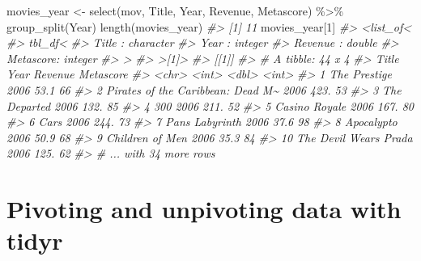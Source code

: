 \documentclass[
]{book}
\newenvironment{Shaded}{\begin{snugshade}}{\end{snugshade}}
\newcommand{\CommentTok}[1]{\textcolor[rgb]{0.56,0.35,0.01}{\textit{#1}}}
\newcommand{\DecValTok}[1]{\textcolor[rgb]{0.00,0.00,0.81}{#1}}
\newcommand{\FunctionTok}[1]{\textcolor[rgb]{0.00,0.00,0.00}{#1}}
\newcommand{\NormalTok}[1]{#1}
\newcommand{\OtherTok}[1]{\textcolor[rgb]{0.56,0.35,0.01}{#1}}
\newcommand{\SpecialCharTok}[1]{\textcolor[rgb]{0.00,0.00,0.00}{#1}}
\begin{document}
\begin{Shaded}
\begin{Highlighting}[]
\NormalTok{movies\_year }\OtherTok{\textless{}{-}} 
\FunctionTok{select}\NormalTok{(mov, Title, Year, Revenue, Metascore) }\SpecialCharTok{\%\textgreater{}\%}
  \FunctionTok{group\_split}\NormalTok{(Year)}
\FunctionTok{length}\NormalTok{(movies\_year)}
\CommentTok{\#\textgreater{} [1] 11}
\NormalTok{movies\_year[}\DecValTok{1}\NormalTok{]}
\CommentTok{\#\textgreater{} \textless{}list\_of\textless{}}
\CommentTok{\#\textgreater{}   tbl\_df\textless{}}
\CommentTok{\#\textgreater{}     Title    : character}
\CommentTok{\#\textgreater{}     Year     : integer}
\CommentTok{\#\textgreater{}     Revenue  : double}
\CommentTok{\#\textgreater{}     Metascore: integer}
\CommentTok{\#\textgreater{}   \textgreater{}}
\CommentTok{\#\textgreater{} \textgreater{}[1]\textgreater{}}
\CommentTok{\#\textgreater{} [[1]]}
\CommentTok{\#\textgreater{} \# A tibble: 44 x 4}
\CommentTok{\#\textgreater{}    Title                              Year Revenue Metascore}
\CommentTok{\#\textgreater{}    \textless{}chr\textgreater{}                             \textless{}int\textgreater{}   \textless{}dbl\textgreater{}     \textless{}int\textgreater{}}
\CommentTok{\#\textgreater{}  1 The Prestige                       2006    53.1        66}
\CommentTok{\#\textgreater{}  2 Pirates of the Caribbean: Dead M\textasciitilde{}  2006   423.         53}
\CommentTok{\#\textgreater{}  3 The Departed                       2006   132.         85}
\CommentTok{\#\textgreater{}  4 300                                2006   211.         52}
\CommentTok{\#\textgreater{}  5 Casino Royale                      2006   167.         80}
\CommentTok{\#\textgreater{}  6 Cars                               2006   244.         73}
\CommentTok{\#\textgreater{}  7 Pan\textquotesingle{}s Labyrinth                    2006    37.6        98}
\CommentTok{\#\textgreater{}  8 Apocalypto                         2006    50.9        68}
\CommentTok{\#\textgreater{}  9 Children of Men                    2006    35.3        84}
\CommentTok{\#\textgreater{} 10 The Devil Wears Prada              2006   125.         62}
\CommentTok{\#\textgreater{} \# ... with 34 more rows}
\end{Highlighting}
\end{Shaded}

\hypertarget{tr-reshape}{%
\section{Pivoting and unpivoting data with tidyr}\label{tr-reshape}}
\end{document}
